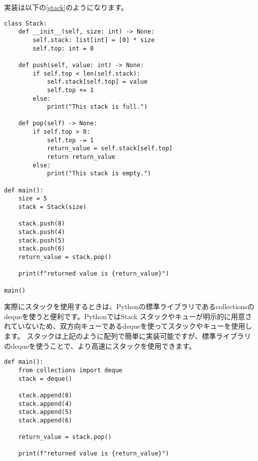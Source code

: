 実装は以下の\ref{stack}のようになります。

\begin{lstlisting}[caption=スタックの実装, label=stack, frame=TRBL, label={stack}]
	class Stack:
    def __init__(self, size: int) -> None:
        self.stack: list[int] = [0] * size
        self.top: int = 0
    
    def push(self, value: int) -> None:
        if self.top < len(self.stack):
            self.stack[self.top] = value
            self.top += 1
        else:
            print("This stack is full.")
    
    def pop(self) -> None:
        if self.top > 0:
            self.top -= 1
            return_value = self.stack[self.top]
            return return_value
        else:
            print("This stack is empty.")

def main():
    size = 5
    stack = Stack(size)
    
    stack.push(8)
    stack.push(4)
    stack.push(5)
    stack.push(6)
    return_value = stack.pop()
    
    print(f"returned value is {return_value}")
    
main()

\end{lstlisting}

\begin{tcolorbox}[enhanced, title=Column1 collections.deque, breakable, colback=white, drop fuzzy shadow, attach boxed title to top center={yshift*=0.1cm}]
	実際にスタックを使用するときは、Pythonの標準ライブラリであるcollectionsのdequeを使うと便利です。PythonではStack スタックやキューが明示的に用意されていないため、双方向キューであるdequeを使ってスタックやキューを使用します。
	スタックは上記のように配列で簡単に実装可能ですが、標準ライブラリのdequeを使うことで、より高速にスタックを使用できます。

	\begin{lstlisting}[caption=スタックの実装, label=stack, frame=TRBL]
		def main():
    from collections import deque
    stack = deque()
    
    stack.append(8)
    stack.append(4)
    stack.append(5)
    stack.append(6)
    
    return_value = stack.pop()
    
    print(f"returned value is {return_value}")
	\end{lstlisting}
\end{tcolorbox}

\newpage

